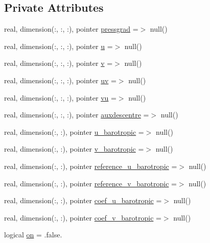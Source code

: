 \subsection*{Private Attributes}
\begin{DoxyCompactItemize}
\item 
real, dimension(\+:, \+:, \+:), pointer \mbox{\hyperlink{structmodulehydrodynamic_1_1t__geostroph_aa76c176d844c125a2acbdcf7675a87cf}{pressgrad}} =$>$ null()
\item 
real, dimension(\+:, \+:, \+:), pointer \mbox{\hyperlink{structmodulehydrodynamic_1_1t__geostroph_a821fc860c03c6f57290b485187b4fa6d}{u}} =$>$ null()
\item 
real, dimension(\+:, \+:, \+:), pointer \mbox{\hyperlink{structmodulehydrodynamic_1_1t__geostroph_ad9288f35bad36982ce9e392967c534a9}{v}} =$>$ null()
\item 
real, dimension(\+:, \+:, \+:), pointer \mbox{\hyperlink{structmodulehydrodynamic_1_1t__geostroph_a05ce7d34124286a0d06890388731d2d0}{uv}} =$>$ null()
\item 
real, dimension(\+:, \+:, \+:), pointer \mbox{\hyperlink{structmodulehydrodynamic_1_1t__geostroph_a050f3358de5b5c1108be1ce5ada8ee57}{vu}} =$>$ null()
\item 
real, dimension(\+:, \+:, \+:), pointer \mbox{\hyperlink{structmodulehydrodynamic_1_1t__geostroph_ad679557d725804ddc680b912fb2a73a9}{auxdescentre}} =$>$ null()
\item 
real, dimension(\+:, \+:), pointer \mbox{\hyperlink{structmodulehydrodynamic_1_1t__geostroph_ab9a2c00e03e2aa85372166f3d76a2cbb}{u\+\_\+barotropic}} =$>$ null()
\item 
real, dimension(\+:, \+:), pointer \mbox{\hyperlink{structmodulehydrodynamic_1_1t__geostroph_a195f0cf3386c8318ebac3e39bbbf5c74}{v\+\_\+barotropic}} =$>$ null()
\item 
real, dimension(\+:, \+:), pointer \mbox{\hyperlink{structmodulehydrodynamic_1_1t__geostroph_ac145a0ee77b7e292c12084d77e9046c4}{reference\+\_\+u\+\_\+barotropic}} =$>$ null()
\item 
real, dimension(\+:, \+:), pointer \mbox{\hyperlink{structmodulehydrodynamic_1_1t__geostroph_ae658bedef165ed1a7a8a1aad26223cde}{reference\+\_\+v\+\_\+barotropic}} =$>$ null()
\item 
real, dimension(\+:, \+:), pointer \mbox{\hyperlink{structmodulehydrodynamic_1_1t__geostroph_a4f195ff50fbe778791b16bc7829e0011}{coef\+\_\+u\+\_\+barotropic}} =$>$ null()
\item 
real, dimension(\+:, \+:), pointer \mbox{\hyperlink{structmodulehydrodynamic_1_1t__geostroph_a4d65e4ce9fe51a41aa4d03fc4e5780aa}{coef\+\_\+v\+\_\+barotropic}} =$>$ null()
\item 
logical \mbox{\hyperlink{structmodulehydrodynamic_1_1t__geostroph_a41a30071715f9ebdd285411a46f84189}{on}} = .false.
\end{DoxyCompactItemize}


